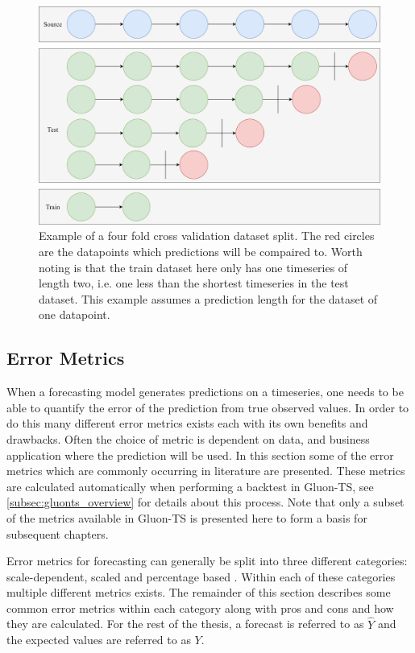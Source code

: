 \begin{figure}[htb]
  \centering
  \includegraphics[width=\linewidth]{./img/k_fold_validation.png}
  \caption{Example of a four fold cross validation dataset split. The red circles are the datapoints which predictions will be compaired to. Worth noting is that the train dataset here only has one timeseries of length two, i.e. one less than the shortest timeseries in the test dataset. This example assumes a prediction length for the dataset of one datapoint.}
  \label{fig:k_fold_validation}
  \endminipage\hfill
\end{figure}


\subsection{Error Metrics}
\label{subsec:error_metrics}
When a forecasting model generates predictions on a timeseries, one needs to be able to quantify the error of the prediction from true observed values. In order to do this many different error metrics exists each with its own benefits and drawbacks. Often the choice of metric is dependent on data, and business application where the prediction will be used. In this section some of the error metrics which are commonly occurring in literature are presented. These metrics are calculated automatically when performing a backtest in Gluon-TS, see \ref{subsec:gluonts_overview} for details about this process. Note that only a subset of the metrics available in Gluon-TS is presented here to form a basis for subsequent chapters.

Error metrics for forecasting can generally be split into three different categories: scale-dependent, scaled and percentage based \cite{hyndman_forecasting_3rd}. Within each of these categories multiple different metrics exists. The remainder of this section describes some common error metrics within each category along with pros and cons and how they are calculated. For the rest of the thesis, a forecast is referred to as \(\hat{Y}\) and the expected values are referred to as \(Y\).

